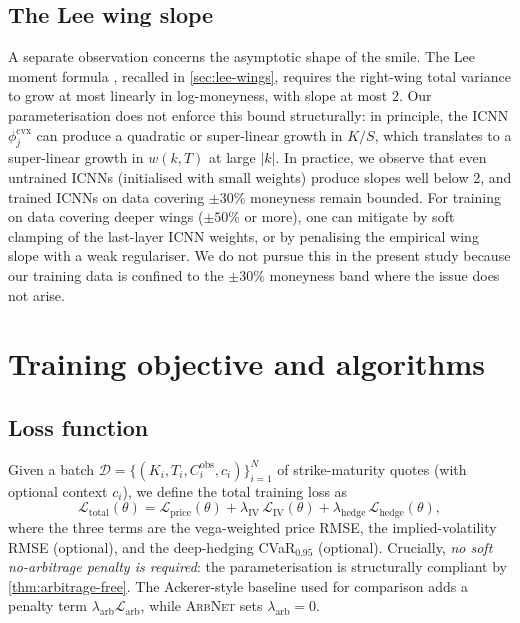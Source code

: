 \documentclass[largeformat]{interact}
\let\cite\citep   %
\theoremstyle{plain}
\theoremstyle{definition}
\newcommand{\arbnet}{\textsc{ArbNet}}
\begin{document}
\subsection{The Lee wing slope}
\label{sec:lee-wing-slope}

A separate observation concerns the asymptotic shape of the smile. The Lee moment formula \cite{lee2004moment,lee2005implied}, recalled in \cref{sec:lee-wings}, requires the right-wing total variance to grow at most linearly in log-moneyness, with slope at most $2$. Our parameterisation does not enforce this bound structurally: in principle, the ICNN $\phi^{\mathrm{cvx}}_j$ can produce a quadratic or super-linear growth in $K/S$, which translates to a super-linear growth in $w(k, T)$ at large $|k|$. In practice, we observe that even untrained ICNNs (initialised with small weights) produce slopes well below 2, and trained ICNNs on data covering $\pm 30\%$ moneyness remain bounded. For training on data covering deeper wings ($\pm 50\%$ or more), one can mitigate by soft clamping of the last-layer ICNN weights, or by penalising the empirical wing slope with a weak regulariser. We do not pursue this in the present study because our training data is confined to the $\pm 30\%$ moneyness band where the issue does not arise.

\section{Training objective and algorithms}
\label{sec:training}

\subsection{Loss function}
\label{sec:loss}

Given a batch $\mathcal{D} = \{(K_i, T_i, C^{\mathrm{obs}}_i, c_i)\}_{i=1}^N$ of strike-maturity quotes (with optional context $c_i$), we define the total training loss as
\begin{equation}
\label{eq:total-loss}
\mathcal{L}_{\mathrm{total}}(\theta) = \mathcal{L}_{\mathrm{price}}(\theta) + \lambda_{\mathrm{IV}}\,\mathcal{L}_{\mathrm{IV}}(\theta) + \lambda_{\mathrm{hedge}}\,\mathcal{L}_{\mathrm{hedge}}(\theta),
\end{equation}
where the three terms are the vega-weighted price RMSE, the implied-volatility RMSE (optional), and the deep-hedging CVaR$_{0.95}$ (optional). Crucially, \emph{no soft no-arbitrage penalty is required}: the parameterisation is structurally compliant by \cref{thm:arbitrage-free}. The Ackerer-style baseline used for comparison adds a penalty term $\lambda_{\mathrm{arb}}\mathcal{L}_{\mathrm{arb}}$, while \arbnet{} sets $\lambda_{\mathrm{arb}} = 0$.
\end{document}
